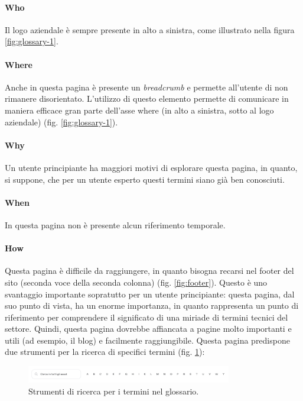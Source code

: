 \paragraph{Who}

Il logo aziendale è sempre presente in alto a sinistra, come illustrato 
nella figura \ref{fig:glossary-1}.

\paragraph{Where}

Anche in questa pagina è presente un \textit{breadcrumb} e permette 
all'utente di non rimanere disorientato. L'utilizzo di questo elemento 
permette di comunicare in maniera efficace gran parte dell'asse where 
(in alto a sinistra, sotto al logo aziendale) (fig. \ref{fig:glossary-1}).

\paragraph{Why}

Un utente principiante ha maggiori motivi di esplorare questa pagina, in 
quanto, si suppone, che per un utente esperto questi termini siano già 
ben conosciuti.

\paragraph{When}

In questa pagina non è presente alcun riferimento temporale.

\paragraph{How}

Questa pagina è difficile da raggiungere, in quanto bisogna recarsi nel 
footer del sito (seconda voce della seconda colonna) (fig. \ref{fig:footer}). 
Questo è uno svantaggio importante sopratutto per un utente principiante: 
questa pagina, dal suo punto di vista, ha un enorme importanza, in quanto 
rappresenta un punto di riferimento per comprendere il significato di una 
miriade di termini tecnici del settore. Quindi, questa pagina dovrebbe 
affiancata a pagine molto importanti e utili (ad esempio, il blog) e 
facilmente raggiungibile. Questa pagina predispone due strumenti per la 
ricerca di specifici termini (fig. \ref{fig:glossary-2}):

\begin{figure}[H]
  \centering
  \includegraphics[width=0.80\textwidth]{res/images/internal-pages/glossary/glossary-2.png}
  \caption{Strumenti di ricerca per i termini nel glossario.}
  \label{fig:glossary-2}
\end{figure}


